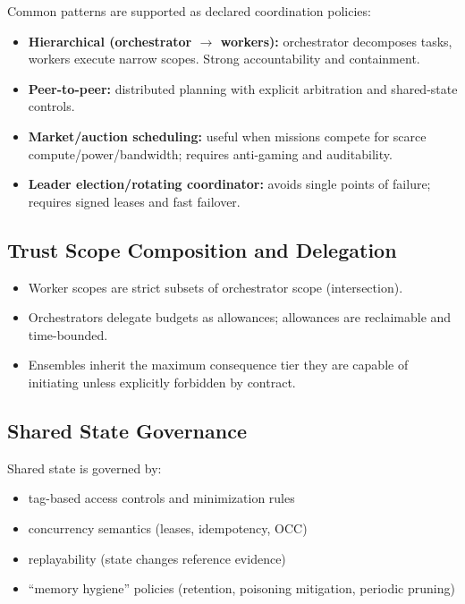 \documentclass[11pt]{article}
\begin{document}
Common patterns are supported as declared coordination policies:

\begin{itemize}
\tightlist
\item
  \textbf{Hierarchical (orchestrator \ensuremath{\rightarrow} workers):} orchestrator
  decomposes tasks, workers execute narrow scopes. Strong accountability
  and containment.
\item
  \textbf{Peer-to-peer:} distributed planning with explicit arbitration
  and shared-state controls.
\item
  \textbf{Market/auction scheduling:} useful when missions compete for
  scarce compute/power/bandwidth; requires anti-gaming and auditability.
\item
  \textbf{Leader election/rotating coordinator:} avoids single points of
  failure; requires signed leases and fast failover.
\end{itemize}

\hypertarget{trust-scope-composition-and-delegation}{%
\subsection{Trust Scope Composition and Delegation}\label{trust-scope-composition-and-delegation}}

\begin{itemize}
\tightlist
\item
  Worker scopes are strict subsets of orchestrator scope (intersection).
\item
  Orchestrators delegate budgets as allowances; allowances are
  reclaimable and time-bounded.
\item
  Ensembles inherit the maximum consequence tier they are capable of
  initiating unless explicitly forbidden by contract.
\end{itemize}

\hypertarget{shared-state-governance}{%
\subsection{Shared State Governance}\label{shared-state-governance}}

Shared state is governed by:

\begin{itemize}
\tightlist
\item
  tag-based access controls and minimization rules
\item
  concurrency semantics (leases, idempotency, OCC)
\item
  replayability (state changes reference evidence)
\item
  ``memory hygiene'' policies (retention, poisoning mitigation, periodic
  pruning)
\end{itemize}
\end{document}
